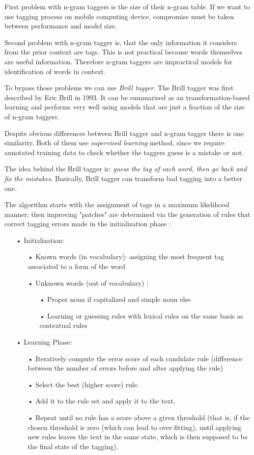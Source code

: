 \documentclass[10pt, conference, compsocconf]{IEEEtran}
\begin{document}
First problem with n-gram taggers is the size of their n-gram table. If we want to use tagging process on mobile computing device, compromise must be taken between performance and model size. 

Second problem with n-gram tagger is, that the only information it considers from the prior context are tags. This is not practical because words themselves are useful information. Therefore n-gram taggers are impractical models for identification of words in context. 
  
To bypass those problems we can use \textit{Brill tagger}. The Brill tagger was first described by Eric Brill in 1993. It can be summarised as an transformation-based learning and performs very well using models that are just a fraction of the size of n-gram taggers.

Despite obvious differences between Brill tagger and n-gram tagger there is one similarity. Both of them use \textit{supervised learning} method, since we require annotated training data to check whether the taggers guess is a mistake or not.

The idea behind the Brill tagger is: \textit{guess the tag of each word, then go back and fix the mistakes}. Basically, Brill tagger can transform bad tagging into a better one. 

The algorithm starts with the assignment of tags in a maximum likelihood manner; then improving "patches" are determined via the generation of rules that correct tagging errors made in the initialization phase \cite{brill}:
\begin{itemize}
\item[•]Initialization:
\begin{itemize}
\item[•]Known words (in vocabulary): assigning the most frequent tag associated to a form of the word
\item[•]Unknown words (out of vocabulary) :
\begin{itemize}
\item[•] Proper noun if capitalized and simple noun else
\item[•] Learning or guessing rules with lexical rules on the same basis as contextual rules
\end{itemize}
\end{itemize}
     
\item[•] Learning Phase:
\begin{itemize}
\item[•] Iteratively compute the error score of each candidate rule (difference between the number of errors before and after applying the rule)
\item[•] Select the best (higher score) rule.
\item[•] Add it to the rule set and apply it to the text.
\item[•] Repeat until no rule has a score above a given threshold (that is, if the chosen threshold is zero (which can lead to over-fitting), until applying new rules leaves the text in the same state, which is then supposed to be the final state of the tagging).
\end{itemize}
\end{itemize}
   
\end{document}
